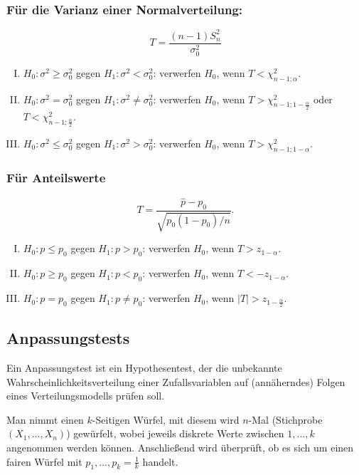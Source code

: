 \subsubsection{Für die Varianz einer Normalverteilung:}
\[T=\frac{(n-1)S_n^2}{\sigma_0^2}\]
\begin{enumerate}[(I)]
    \item $H_0:\sigma^2\ge\sigma_0^2$ gegen $H_1:\sigma^2<\sigma_0^2$:
    verwerfen $H_0$, wenn $T<\chi^2_{n-1;\alpha}$.
    \item $H_0:\sigma^2=\sigma_0^2$ gegen $H_1:\sigma^2\neq\sigma_0^2$:
    verwerfen $H_0$, wenn $T>\chi^2_{n-1;1-\frac{\alpha}{2}}$
    oder ${T<\chi^2_{n-1;\frac{\alpha}{2}}}$.
    \item $H_0:\sigma^2\le\sigma_0^2$ gegen $H_1:\sigma^2>\sigma_0^2$:
    verwerfen $H_0$, wenn $T>\chi^2_{n-1;1-\alpha}$.
\end{enumerate}
\subsubsection{Für Anteilswerte}
\[T=\frac{\hat p-p_0}{\sqrt{p_0(1-p_0)/n}}.\]
\begin{enumerate}[(I)]
    \item $H_0:p \le p_0$ gegen $H_1:p> p_0$:
    verwerfen $H_0$, wenn $T>z_{1-\alpha}$.
    \item $H_0:p \ge p_0$ gegen $H_1:p< p_0$:
    verwerfen $H_0$, wenn $T<-z_{1-\alpha}$.
    \item $H_0:p =p_0$ gegen $H_1:p\neq p_0$:
    verwerfen $H_0$, wenn $|T|>z_{1-\frac{\alpha}{2}}$.
\end{enumerate}


\subsection{Anpassungstests}
Ein Anpassungstest ist ein Hypothesentest, der die unbekannte Wahrscheinlichkeitsverteilung einer Zufallsvariablen auf (annäherndes) Folgen eines Verteilungsmodells prüfen soll.
\begin{bsp}\label{bsp:kwuerfel}
Man nimmt einen $k$-Seitigen Würfel, mit diesem wird $n$-Mal (Stichprobe $(X_1,...,X_n)$) gewürfelt, wobei jeweils diskrete Werte zwischen $1,...,k$ angenommen werden können. 
Anschließend wird überprüft, ob es sich um einen fairen Würfel mit ${p_1,...,p_k=\frac{1}{k}}$ handelt.
\end{bsp}

